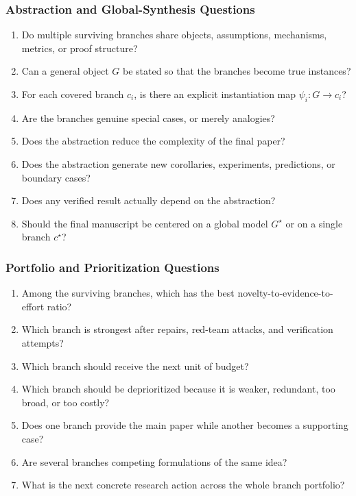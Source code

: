 \documentclass[11pt]{article}
\begin{document}
\subsubsection*{Abstraction and Global-Synthesis Questions}
\begin{enumerate}[leftmargin=*]
    \item Do multiple surviving branches share objects, assumptions, mechanisms, metrics, or proof structure?
    \item Can a general object $G$ be stated so that the branches become true instances?
    \item For each covered branch $c_i$, is there an explicit instantiation map $\psi_i:G\rightarrow c_i$?
    \item Are the branches genuine special cases, or merely analogies?
    \item Does the abstraction reduce the complexity of the final paper?
    \item Does the abstraction generate new corollaries, experiments, predictions, or boundary cases?
    \item Does any verified result actually depend on the abstraction?
    \item Should the final manuscript be centered on a global model $G^\star$ or on a single branch $c^\star$?
\end{enumerate}

\subsubsection*{Portfolio and Prioritization Questions}
\begin{enumerate}[leftmargin=*]
    \item Among the surviving branches, which has the best novelty-to-evidence-to-effort ratio?
    \item Which branch is strongest after repairs, red-team attacks, and verification attempts?
    \item Which branch should receive the next unit of budget?
    \item Which branch should be deprioritized because it is weaker, redundant, too broad, or too costly?
    \item Does one branch provide the main paper while another becomes a supporting case?
    \item Are several branches competing formulations of the same idea?
    \item What is the next concrete research action across the whole branch portfolio?
\end{enumerate}
\end{document}
